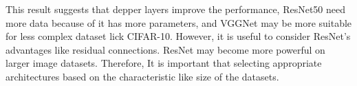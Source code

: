 \documentclass[extendedabs]{bmvc2k}
\begin{document}
This result suggests that depper layers improve the performance, ResNet50 need more data because of it has more parameters, and VGGNet may be more suitable for less complex dataset lick CIFAR-10. However, it is useful to consider ResNet's advantages like residual connections. ResNet may become more powerful on larger image datasets. Therefore, It is important that selecting appropriate architectures based on the characteristic like size of the datasets.

\newpage

\end{document}
